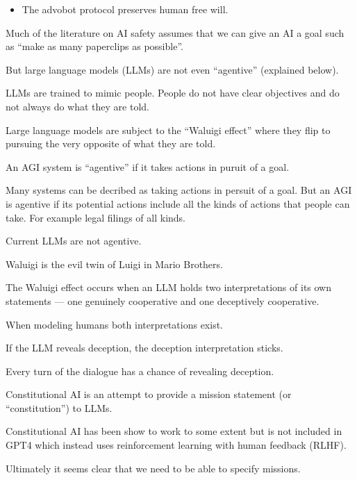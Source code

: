 {\begin{itemize}
\vfill
\item The advobot protocol preserves human free will.
\end{itemize}



Much of the literature on AI safety assumes that we can give an AI a goal such as ``make as many paperclips as possible''.

\vfill
But large language models (LLMs) are not even ``agentive'' (explained below).

\vfill
LLMs are trained to mimic people.  People do not have clear objectives and do not always do what they are told.

\vfill
Large language models are subject to the ``Waluigi effect'' where they flip to pursuing the very opposite of what they are told.


An AGI system is ``agentive'' if it takes actions in puruit of a goal.

\vfill
Many systems can be decribed as taking actions in persuit of a goal.  But an AGI is agentive if its potential actions include
all the kinds of actions that people can take.  For example legal filings of all kinds.

\vfill
Current LLMs are not agentive.


Waluigi is the evil twin of Luigi in Mario Brothers.

\vfill
The Waluigi effect occurs when an LLM holds two
interpretations of its own statements --- one genuinely cooperative
and one deceptively cooperative.

\vfill
When modeling humans both interpretations exist.

\vfill
If the LLM reveals deception, the deception interpretation sticks.

\vfill
Every turn of the dialogue has a chance of revealing deception.




Constitutional AI is an attempt to provide a mission statement (or ``constitution'') to LLMs.

\vfill
Constitutional AI has been show to work to some extent but is not included in GPT4 which instead uses reinforcement learning with human feedback (RLHF).

\vfill
Ultimately it seems clear that we need to be able to specify missions.

}

